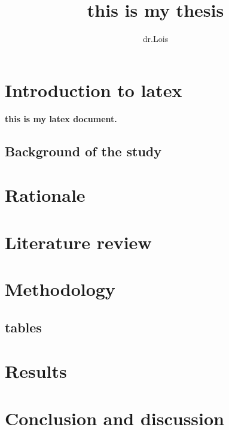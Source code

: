 \documentclass{article}
\title{this is my thesis}
\author{dr.Lois}
\begin{document}
\maketitle

\section{Introduction to latex}
\textbf{this is my latex document.}

\subsection{Background of the study}
\section{Rationale}
\section{Literature review}
\section{Methodology}
\subsection{tables}
\begin{figure}
	
\end{figure}
\section{Results}
\section{Conclusion and discussion}
\end{document}
